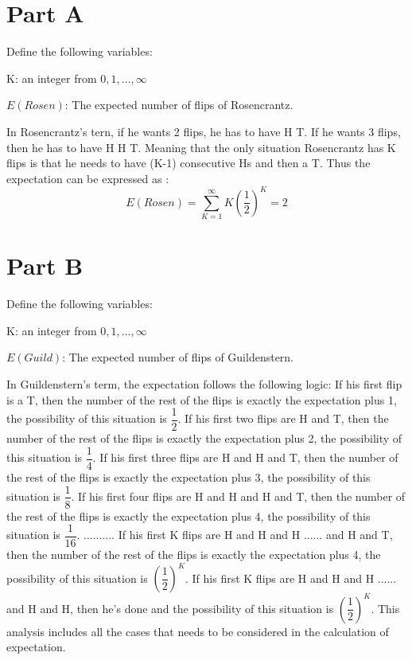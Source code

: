 \documentclass[11pt]{article}
\begin{document}


\section{Part A}
Define the following variables:

\noindent K: an integer from $0,1,\ldots,\infty$

\noindent $E(Rosen)$: The expected number of flips of Rosencrantz.

\noindent In Rosencrantz's tern, if he wants 2 flips, he has to have H T. If he wants 3 flips, then he has to have H H T. Meaning that the only situation Rosencrantz has K flips is that he needs to have (K-1) consecutive Hs and then a T. Thus the expectation can be expressed as :
\[
E(Rosen)=\sum\limits_{K=1}^{\infty}K{(\dfrac{1}{2})}^K=2
\]

\section{Part B}
Define the following variables:

\noindent K: an integer from $0,1,\ldots,\infty$

\noindent $E(Guild)$: The expected number of flips of Guildenstern.

\noindent In Guildenstern's term, the expectation follows the following logic: If his first flip is a T, then the number of the rest of the flips is exactly the expectation plus 1, the possibility of this situation is $\dfrac{1}{2}$. If his first two flips are H and T, then the number of the rest of the flips is exactly the expectation plus 2, the possibility of this situation is $\dfrac{1}{4}$.  If his first three flips are H and H and T, then the number of the rest of the flips is exactly the expectation plus 3, the possibility of this situation is $\dfrac{1}{8}$. If his first four flips are H and H and H and T, then the number of the rest of the flips is exactly the expectation plus 4, the possibility of this situation is $\dfrac{1}{16}$. .......... If his first K flips are H and H and H ...... and H and T, then the number of the rest of the flips is exactly the expectation plus 4, the possibility of this situation is ${(\dfrac{1}{2})}^K$. If his first K flips are H and H and H ...... and H and H, then he's done and the possibility of this situation is ${(\dfrac{1}{2})}^K$.  This analysis includes all the cases that needs to be considered in the calculation of expectation.
\end{document}
